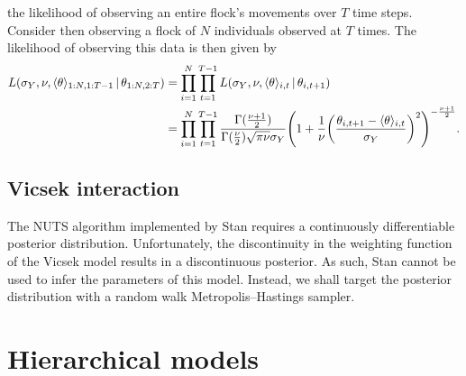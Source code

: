 the likelihood of observing an entire flock's movements over $T$ time steps. Consider then
observing a flock of $N$ individuals observed at $T$ times. The likelihood of observing
this data is then given by
\begin{align*}
    L(\sigma_Y, \nu, \langle\theta\rangle_{1:N,1:T-1} \,|\,\theta_{1:N,2:T}) 
    &= \prod_{i=1}^N \prod_{t=1}^{T-1} L(\sigma_Y,\nu,\langle\theta\rangle_{i,t}\,|\,\theta_{i,t+1})  \\
    &= \prod_{i=1}^N \prod_{t=1}^{T-1} 
        \frac{\Gamma(\frac{\nu +1 }{2})}{\Gamma(\frac{\nu}{2})\sqrt{\pi\nu}\sigma_Y}
        \Bigg(1 + \frac{1}{\nu}
                  \bigg(\frac{\theta_{i,t+1}-\langle\theta\rangle_{i,t}}{\sigma_Y}\bigg)^2
        \Bigg)^{-\frac{\nu+1}{2}}.
\end{align*}

\subsection{Vicsek interaction}

The NUTS algorithm implemented by Stan requires a continuously differentiable posterior
distribution. Unfortunately, the discontinuity in the weighting function of the
Vicsek model results in a discontinuous posterior. As such, Stan cannot be used to infer
the parameters of this model. Instead, we shall target the posterior distribution with a
random walk Metropolis--Hastings sampler.

\section{Hierarchical models}
